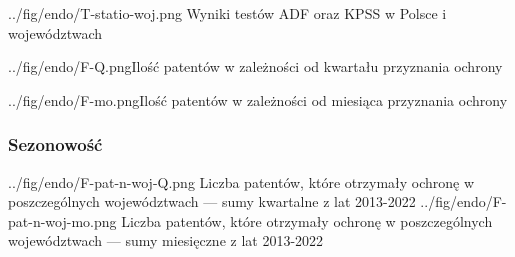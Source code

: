   \tblside
{../fig/endo/T-statio-woj.png}
{ Wyniki testów ADF oraz KPSS w Polsce i województwach}



  \fig
{../fig/endo/F-Q.png}{Ilość patentów w zależności od kwartału przyznania ochrony}

  \fig
{../fig/endo/F-mo.png}{Ilość patentów w zależności od miesiąca przyznania ochrony}



  \newpage\subsubsection
{Sezonowość}

  \figsides
{../fig/endo/F-pat-n-woj-Q.png}
{ Liczba patentów, które otrzymały ochronę w poszczególnych województwach 
  --- sumy kwartalne z lat 2013-2022 }
{../fig/endo/F-pat-n-woj-mo.png}
{ Liczba patentów, które otrzymały ochronę w poszczególnych województwach 
  --- sumy miesięczne z lat 2013-2022 }
